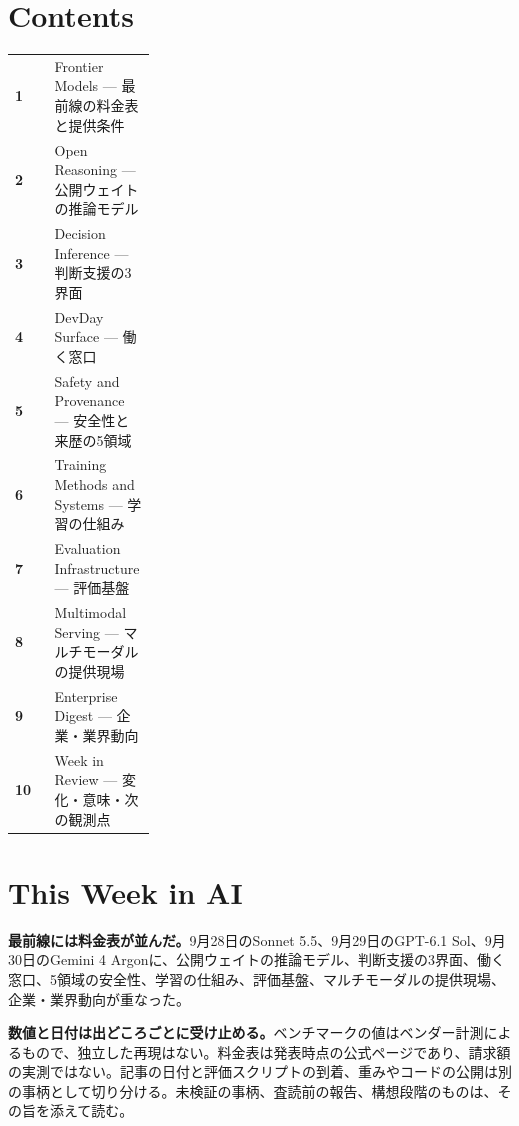 \section*{Contents}
\begin{tabularx}{0.98\linewidth}{@{}>{\bfseries}p{0.28\linewidth}X@{}}
  1 & Frontier Models --- 最前線の料金表と提供条件 \\
  2 & Open Reasoning --- 公開ウェイトの推論モデル \\
  3 & Decision Inference --- 判断支援の3界面 \\
  4 & DevDay Surface --- 働く窓口 \\
  5 & Safety and Provenance --- 安全性と来歴の5領域 \\
  6 & Training Methods and Systems --- 学習の仕組み \\
  7 & Evaluation Infrastructure --- 評価基盤 \\
  8 & Multimodal Serving --- マルチモーダルの提供現場 \\
  9 & Enterprise Digest --- 企業・業界動向 \\
  10 & Week in Review --- 変化・意味・次の観測点 \\
\end{tabularx}

\vspace{4mm}
\section*{This Week in AI}

\begin{tcolorbox}[enhanced,colback=SurveySoft,colframe=SurveyRule,boxrule=0.4pt,arc=1mm,left=3mm,right=3mm,top=2mm,bottom=2mm]
\textbf{最前線には料金表が並んだ。}\quad 9月28日のSonnet 5.5、9月29日のGPT-6.1 Sol、9月30日のGemini 4 Argonに、公開ウェイトの推論モデル、判断支援の3界面、働く窓口、5領域の安全性、学習の仕組み、評価基盤、マルチモーダルの提供現場、企業・業界動向が重なった。
\end{tcolorbox}

\begin{tcolorbox}[enhanced,colback=SurveySoft,colframe=SurveyRule,boxrule=0.4pt,arc=1mm,left=3mm,right=3mm,top=2mm,bottom=2mm]
\textbf{数値と日付は出どころごとに受け止める。}\quad ベンチマークの値はベンダー計測によるもので、独立した再現はない。料金表は発表時点の公式ページであり、請求額の実測ではない。記事の日付と評価スクリプトの到着、重みやコードの公開は別の事柄として切り分ける。未検証の事柄、査読前の報告、構想段階のものは、その旨を添えて読む。
\end{tcolorbox}

